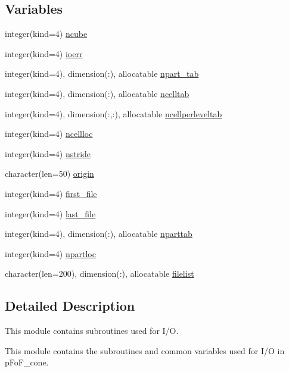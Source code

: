 \subsection*{Variables}
\begin{DoxyCompactItemize}
\item 
integer(kind=4) \hyperlink{namespacemodio_af7ac0e60c49f16bf08605237dd728508}{ncube}
\item 
integer(kind=4) \hyperlink{namespacemodio_aea2235cb150c2f86e8564ce3d2e606a1}{ioerr}
\item 
integer(kind=4), dimension(\+:), allocatable \hyperlink{namespacemodio_a0bb05c9005df17b314c2a7e0f43e758c}{npart\+\_\+tab}
\item 
integer(kind=4), dimension(\+:), allocatable \hyperlink{namespacemodio_a0a0852674d63f2d9f6c23969d3f7016c}{ncelltab}
\item 
integer(kind=4), dimension(\+:,\+:), allocatable \hyperlink{namespacemodio_a541838a88faeed3af974f875bd73ee00}{ncellperleveltab}
\item 
integer(kind=4) \hyperlink{namespacemodio_a1c862995bd67ce8f4a3305dad6022064}{ncellloc}
\item 
integer(kind=4) \hyperlink{namespacemodio_a6661d8a6f911c13b15cebca52e76b6fc}{nstride}
\item 
character(len=50) \hyperlink{namespacemodio_a12ada16137589f81ccc218e3b77f25c6}{origin}
\item 
integer(kind=4) \hyperlink{namespacemodio_a2eee1b20e9f6d0c4ab4e219d76aefc9a}{first\+\_\+file}
\item 
integer(kind=4) \hyperlink{namespacemodio_a3e203a61ede6084d5dd96d438500b155}{last\+\_\+file}
\item 
integer(kind=4), dimension(\+:), allocatable \hyperlink{namespacemodio_a4a7b05300378789a7f94a217ba703153}{nparttab}
\item 
integer(kind=4) \hyperlink{namespacemodio_a0bf1df6ff1e675aabce26f3d7289a700}{npartloc}
\item 
character(len=200), dimension(\+:), allocatable \hyperlink{namespacemodio_a31e8a393faa96e92df4d56794cd2eadd}{filelist}
\end{DoxyCompactItemize}


\subsection{Detailed Description}
This module contains subroutines used for I/O. 

This module contains the subroutines and common variables used for I/O in p\+Fo\+F\+\_\+cone.

